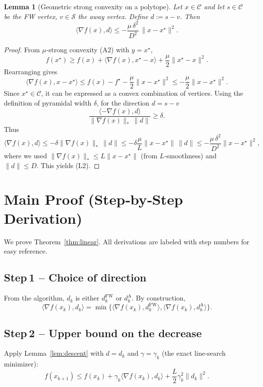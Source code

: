 \documentclass{article}
\newtheorem{lemma}{Lemma}
\begin{document}
\begin{lemma}[Geometric strong convexity on a polytope]\label{lem:geoSC}
Let $x\in\mathcal C$ and let $s\in\mathcal C$ be the FW vertex, $v\in\mathcal S$ the away vertex.
Define $d:=s-v$. Then
\[
\langle\nabla f(x),d\rangle\le -\frac{\mu\,\delta^{2}}{D^{2}}\,\|x-x^\star\|^{2}.
\tag{L2}
\]
\end{lemma}
\begin{proof}
From $\mu$‑strong convexity (A2) with $y=x^\star$,
\[
f(x^\star)\ge f(x)+\langle\nabla f(x),x^\star-x\rangle+\frac{\mu}{2}\|x^\star-x\|^{2}.
\]
Rearranging gives
\[
\langle\nabla f(x),x-x^\star\rangle\le f(x)-f^\star-\frac{\mu}{2}\|x-x^\star\|^{2}\le -\frac{\mu}{2}\|x-x^\star\|^{2}.
\tag{P1}
\]
Since $x^\star\in\mathcal C$, it can be expressed as a convex combination of vertices.
Using the definition of pyramidal width $\delta$, for the direction $d=s-v$
\[
\frac{\langle-\nabla f(x),d\rangle}{\|\nabla f(x)\|_*\,\|d\|}
\ge\delta .
\]
Thus
\[
\langle\nabla f(x),d\rangle\le -\delta\|\nabla f(x)\|_*\,\|d\|
\le -\delta\frac{\mu}{L}\|x-x^\star\|\,\|d\|
\le -\frac{\mu\,\delta^{2}}{D^{2}}\|x-x^\star\|^{2},
\]
where we used $\|\nabla f(x)\|_*\le L\|x-x^\star\|$ (from $L$‑smoothness) and
$\|d\|\le D$. This yields (L2). \hfill\qedhere
\end{proof}

\section*{Main Proof (Step‑by‑Step Derivation)}
We prove Theorem~\ref{thm:linear}.  
All derivations are labeled with step numbers for easy reference.

\subsection*{Step 1 – Choice of direction}
From the algorithm, $d_k$ is either $d^{\mathrm{FW}}_k$ or $d^{\mathrm{A}}_k$.
By construction,
\[
\langle\nabla f(x_k),d_k\rangle
= \min\big\{\langle\nabla f(x_k),d^{\mathrm{FW}}_k\rangle,
\langle\nabla f(x_k),d^{\mathrm{A}}_k\rangle\big\}.
\tag{S1}
\]

\subsection*{Step 2 – Upper bound on the decrease}
Apply Lemma~\ref{lem:descent} with $d=d_k$ and $\gamma=\gamma_k$ (the exact line‑search minimizer):
\[
f(x_{k+1})\le f(x_k)+\gamma_k\langle\nabla f(x_k),d_k\rangle
+\frac{L}{2}\gamma_k^{2}\|d_k\|^{2}.
\tag{S2}
\]
\end{document}
